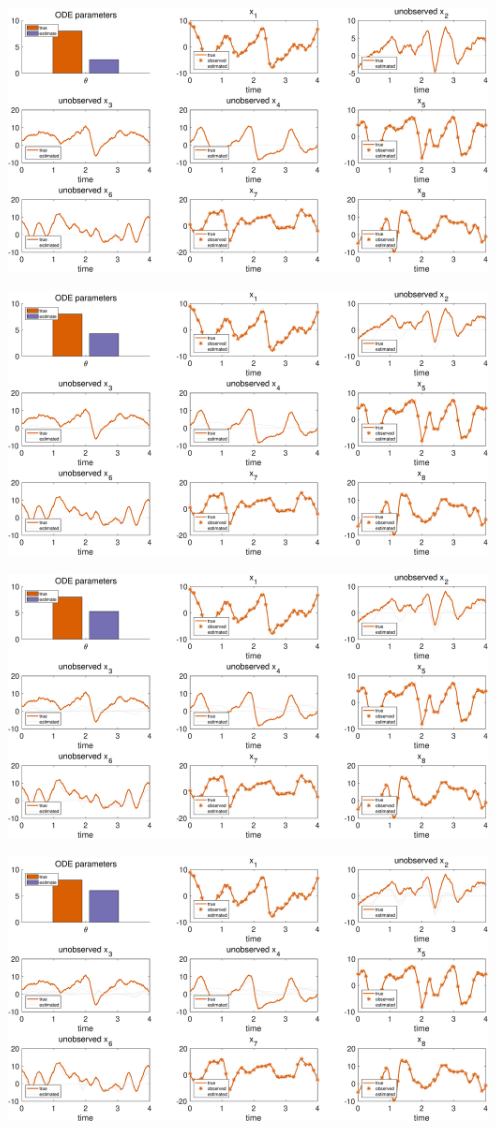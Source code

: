 {
\centering
\includegraphics [width=5in]{Lorenz96_2_05.eps}

\includegraphics [width=5in]{Lorenz96_2_06.eps}

\includegraphics [width=5in]{Lorenz96_2_07.eps}

\includegraphics [width=5in]{Lorenz96_2_08.eps}

}
